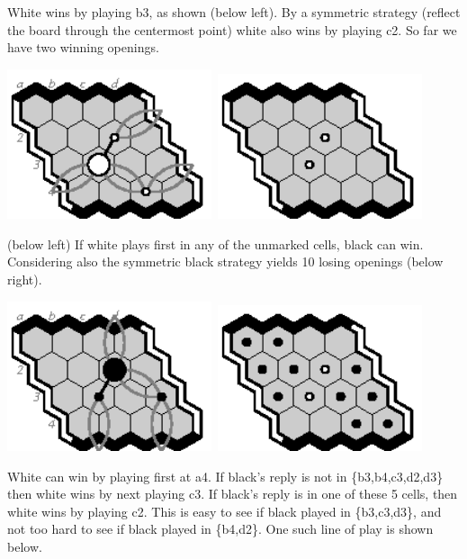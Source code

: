 \documentclass[12pt]{article}
\begin{document}
White wins by playing b3, as shown (below left).
By a symmetric strategy (reflect the board through the 
centermost point) white also wins by playing c2.
So far we have two winning openings.
\vfill

\includegraphics[width=60mm]{fz/pix/4.1strat2.eps}\
\includegraphics[width=60mm]{fz/pix/4x4.winners0.eps}
\vfill~

\newpage
\noindent
(below left) If white plays first in any of the unmarked cells,
black can win. Considering also the 
symmetric black strategy yields 10 losing openings (below right).
\vfill

\includegraphics[width=60mm]{fz/pix/4.1strat.eps}\
\includegraphics[width=60mm]{fz/pix/4x4.winners1.eps}
\vfill

White can win by playing first at a4.
If black's reply is not in \{b3,b4,c3,d2,d3\}
then white wins by next playing c3.
If black's reply is in one of these 5 cells,
then white wins by playing c2.
This is easy to see if black played in \{b3,c3,d3\},
and not too hard to see if black played in \{b4,d2\}.
One such line of play is shown below.
\end{document}
